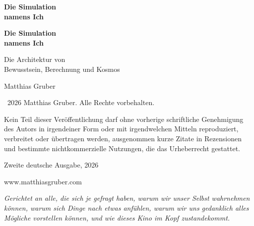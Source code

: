 \documentclass[11pt, twoside, openright]{book}
\makeatletter
\def\cleardoublepage{\clearpage\if@twoside \ifodd\c@page\else
  \thispagestyle{empty}\hbox{}\newpage
  \if@twocolumn\hbox{}\newpage\fi\fi\fi}
\makeatother
\begin{document}
\frontmatter
\pagestyle{empty}

\vspace*{3in}
\begin{center}
{\Huge\bfseries Die Simulation\\[0.3cm] namens Ich\par}
\end{center}
\cleardoublepage

\vspace*{2in}
\begin{center}
{\Huge\bfseries Die Simulation\\[0.3cm] namens Ich\par}
\vspace{0.8cm}
{\Large Die Architektur von\\[0.2cm] Bewusstsein, Berechnung und Kosmos\par}
\vspace{2cm}
{\large Matthias Gruber\par}
\end{center}
\clearpage

\thispagestyle{empty}
\vspace*{\fill}
{\small
\noindent \textcopyright\ 2026 Matthias Gruber. Alle Rechte vorbehalten.\par
\vspace{0.5cm}
\noindent Kein Teil dieser Veröffentlichung darf ohne vorherige schriftliche
Genehmigung des Autors in irgendeiner Form oder mit irgendwelchen Mitteln
reproduziert, verbreitet oder übertragen werden, ausgenommen kurze Zitate
in Rezensionen und bestimmte nichtkommerzielle Nutzungen, die das
Urheberrecht gestattet.\par
\vspace{0.5cm}

\vspace{0.5cm}
\noindent Zweite deutsche Ausgabe, 2026\par
\vspace{0.5cm}
\noindent www.matthiasgruber.com\par
}
\cleardoublepage

\thispagestyle{empty}
\vspace*{3in}
\begin{center}
\begin{minipage}{0.75\textwidth}
\centering
\textit{Gerichtet an alle, die sich je gefragt haben, warum wir unser Selbst
wahrnehmen können, warum sich Dinge nach etwas anfühlen, warum wir uns
gedanklich alles Mögliche vorstellen können, und wie dieses Kino im Kopf
zustandekommt.}
\end{minipage}
\end{center}
\cleardoublepage
\end{document}
